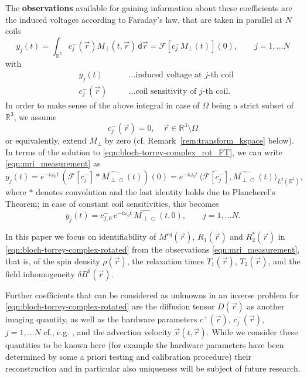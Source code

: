 \documentclass{ws-m3as}
\def\Mpp{M_{\perp\!\!\!\!\!\bigcirc}}
\def\Mphp{\widehat{\Mpp}}
\newcommand{\revision}[1]{{ #1}}
\newcommand{\Margin}[1]{}
\begin{document}
The \textbf{observations} available for gaining information about these coefficients are the induced voltages according to Faraday's law, that are taken in parallel at $N$ coils   
\begin{equation}\label{eqn:mri_measurement}
    y_j(t) = \int_{\mathbb{R}^3} c^-_j(\vec r) M_{\perp}(t, \vec r) \,\textsf{d}\vec r 
= \mathcal{F}[c^-_j M_{\perp}(t)](0)   
 ,\qquad j=1,\ldots N
\end{equation}
with
\[
\begin{aligned}
&y_j(t)\quad&&\text{\ldots induced voltage at $j$-th coil}\\
&c^-_j(\vec r) \quad&&\text{\ldots coil sensitivity of $j$-th coil.}
\end{aligned}
\]
In order to make sense of the above integral in case of $\Omega$ being a strict subset of $\mathbb{R}^3$, we assume
\begin{equation}\label{supp_cj-}
c_j^-(\vec r)=0, \quad \vec r \in \mathbb{R}^3\setminus\Omega
\end{equation}
or equivalently, extend $M_\perp$ by zero (cf. Remark~\ref{rem:transform_kspace} below).
In terms of the solution to \eqref{eqn:bloch-torrey-complex_rot_FT}, we can write \eqref{eqn:mri_measurement} as
\begin{equation}\label{eqn:mri_measurement_Fourier}
y_j(t)= e^{-i\omega_0t}\,(\mathcal{F}[c^-_j]*\Mphp(t))(0)
=e^{-i\omega_0t}\,\langle \overline{\mathcal{F}[c^-_j]},\Mphp(t)\rangle_{L^2(\mathbb{R}^3)},
\end{equation}
where $*$ denotes convolution and the last identity holds due to Plancherel's Theorem; in case of constant coil sensitivities, this becomes
\begin{equation}\label{eqn:mri_measurement_Fourier_cj0}
y_j(t)=c^-_{j,0}\,e^{-i\omega_0t}\,\Mphp(t,0)
,\qquad j=1,\ldots N.
\end{equation}


In this paper we focus on identifiability of $M^{eq}(\vec r)$, $R_1(\vec r)$ and  $R_2^*(\vec r)$ in \eqref{eqn:bloch-torrey-complex-rotated} from the observations \eqref{eqn:mri_measurement}, that is, of the spin density $\rho(\vec r)$, the relaxation times $T_1(\vec r)$, $T_2(\vec r)$, and the field inhomogeneity $\delta B^0(\vec r)$. 

Further coefficients that can be considered as unknowns in an inverse problem for \eqref{eqn:bloch-torrey-complex-rotated} are the diffusion tensor $D(\vec r)$ as another imaging quantity, as well as the hardware parameters 
$c^+(\vec r)$, %
$c^-_j(\vec r)$, %
$j=1,\ldots N$
cf., e.g. \cite{UeckerHohageBlockFrahm2008}, and
the advection velocity $\vec v(t,\vec r)$.
\revision{While we consider these quantities to be known here (for example the hardware parameters have been determined by some a priori testing and calibration procedure) their reconstruction and in particular also uniqueness will be subject of future research.}
\Margin{R2 (2)}
\Margin{R2 5)}
\end{document}

